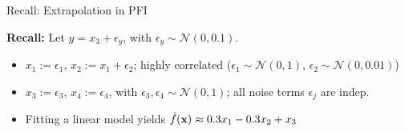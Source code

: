 \documentclass[10pt,compress,t,notes=noshow, xcolor=table]{beamer}
\begin{document}
\begin{frame}{Recall: Extrapolation in PFI}

 \textbf{Recall:} 
 Let $y = x_3 + \epsilon_y$, with $\epsilon_y \sim \mathcal{N}(0, 0.1)$.

\begin{itemize}
  \item $x_1 := \epsilon_1$, $x_2 := x_1 + \epsilon_2$; highly correlated  
        ($\epsilon_1 \sim \mathcal{N}(0,1)$, $\epsilon_2 \sim \mathcal{N}(0, 0.01)$)
  \item $x_3 := \epsilon_3$, $x_4 := \epsilon_4$, with $\epsilon_3, \epsilon_4 \sim \mathcal{N}(0,1)$; all noise terms $\epsilon_j$ are indep.
  \item Fitting a linear model yields $\hat{f}(\mathbf{x}) \approx 0.3 x_1 - 0.3 x_2 + x_3$
\end{itemize}




\end{frame}
\end{document}

